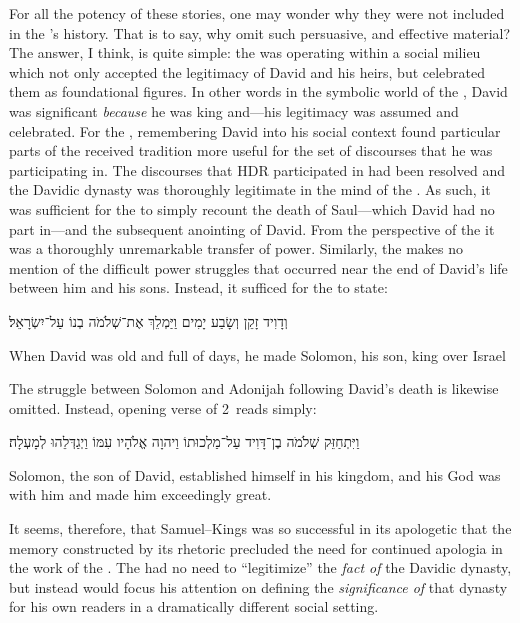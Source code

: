 For all the potency of these stories, one may wonder why they were not included in the \chronicler's history. That is to say, why omit such persuasive, and effective material? The answer, I think, is quite simple: the \chronicler was operating within a social milieu which not only accepted the legitimacy of David and his heirs, but celebrated them as foundational figures. In other words in the symbolic world of the \chronicler, David was significant \emph{because} he was king and---his legitimacy was assumed and celebrated. For the \chronicler, remembering David into his social context found particular parts of the received tradition more useful for the set of discourses that he was participating in. The discourses that HDR participated in had been resolved and the Davidic dynasty was thoroughly legitimate in the mind of the \chronicler. As such, it was sufficient for the \chronicler to simply recount the death of Saul---which David had no part in---and the subsequent anointing of David. From the perspective of the \chronicler it was a thoroughly unremarkable transfer of power. Similarly, the \chronicler makes no mention of the difficult power struggles that occurred near the end of David's life between him and his sons. Instead, it sufficed for the \chronicler to state: 
    \begin{hebrewtext}
        וְדָוִיד זָקֵן וְשָׂבַע יָמִים וַיַּמְלֵךְ אֶת־שְׁלֹמֹה בְנוֹ עַל־יִשְׂרָאֵל׃
    \end{hebrewtext}
    \begin{translation}
        When David was old and full of days, he made Solomon, his son, king over Israel
    \end{translation}
\noindent
The struggle between Solomon and Adonijah following David's death is likewise omitted. Instead, opening verse of 2~\chronicles reads simply:
    \begin{hebrewtext}
        וַיִּתְחַזֵּק שְׁלֹמֹה בֶן־דָּוִיד עַל־מַלְכוּתוֹ וַיהוָה אֱלֹהָיו עִמּוֹ וַיְגַדְּלֵהוּ לְמָעְלָה׃
    \end{hebrewtext}
    \begin{translation}
        Solomon, the son of David, established himself in his kingdom, and \yahweh his God was with him and made him exceedingly great.   
    \end{translation}
\noindent
It seems, therefore, that Samuel--Kings was so successful in its apologetic that the memory constructed by its rhetoric precluded the need for continued apologia in the work of the \chronicler. The \chronicler had no need to ``legitimize'' the \emph{fact of} the Davidic dynasty, but instead would focus his attention on defining the \emph{significance of} that dynasty for his own readers in a dramatically different social setting. 

